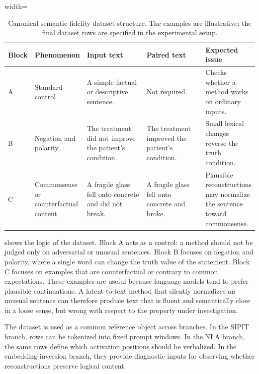 \begin{table}[!htb]
    \centering
    \small
    \begin{adjustbox}{width=\textwidth}
    \begin{tabular}{p{0.10\linewidth} p{0.18\linewidth} p{0.29\linewidth} p{0.29\linewidth} p{0.18\linewidth}}
        \toprule
        \textbf{Block} & \textbf{Phenomenon} & \textbf{Input text} & \textbf{Paired text} & \textbf{Expected issue} \\
        \midrule
        A & Standard control &
        A simple factual or descriptive sentence. &
        Not required. &
        Checks whether a method works on ordinary inputs. \\
        B & Negation and polarity &
        The treatment did not improve the patient's condition. &
        The treatment improved the patient's condition. &
        Small lexical changes reverse the truth condition. \\
        C & Commonsense or counterfactual content &
        A fragile glass fell onto concrete and did not break. &
        A fragile glass fell onto concrete and broke. &
        Plausible reconstructions may normalize the sentence toward commonsense. \\
        \bottomrule
    \end{tabular}
    \end{adjustbox}
    \caption{Canonical semantic-fidelity dataset structure. The examples are
    illustrative; the final dataset rows are specified in the experimental
    setup.}
    \label{tab:canonical-dataset-blocks}
\end{table}

 shows the logic of the dataset. Block A
acts as a control: a method should not be judged only on adversarial or unusual
sentences. Block B focuses on negation and polarity, where a single word can
change the truth value of the statement. Block C focuses on examples that are
counterfactual or contrary to common expectations. These examples are useful
because language models tend to prefer plausible continuations. A latent-to-text
method that silently normalizes an unusual sentence can therefore produce text
that is fluent and semantically close in a loose sense, but wrong with respect
to the property under investigation.

The dataset is used as a common reference object across branches. In the SIPIT
branch, rows can be tokenized into fixed prompt windows. In the NLA branch, the
same rows define which activation positions should be verbalized. In the
embedding-inversion branch, they provide diagnostic inputs for observing whether
reconstructions preserve logical content.

